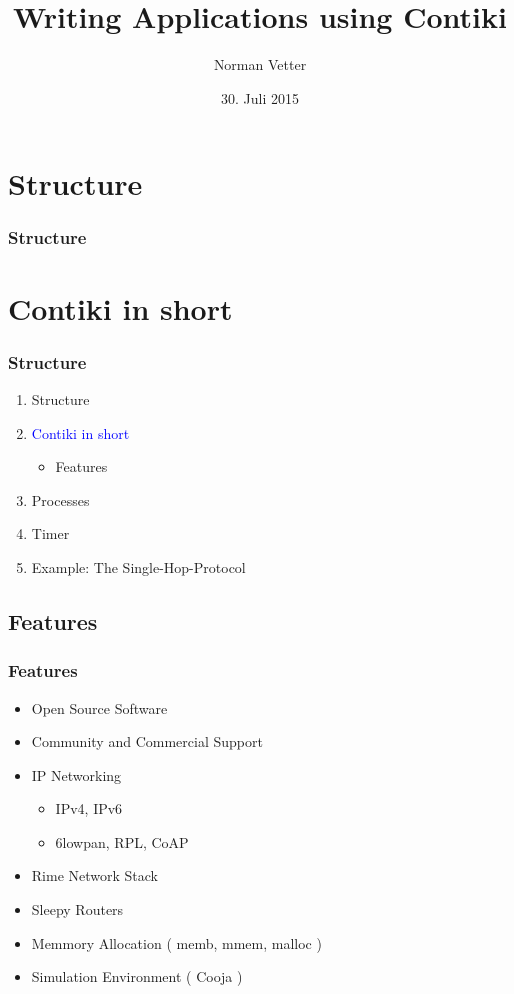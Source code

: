 \documentclass{beamer}
\title{Writing Applications using Contiki}
\author{Norman Vetter}
\date{30. Juli 2015}
\institute[Universität Potsdam]{}
\begin{document}
\begin{frame}
\titlepage
\end{frame}

\section{Structure}
\begin{frame}
\frametitle{Structure}
\tableofcontents
\end{frame}
\section{Contiki in short}
\begin{frame}
\frametitle{Structure}
\begin{enumerate}
\item Structure
\item \textcolor{blue}{Contiki in short}
\begin{itemize}
\item Features
\end{itemize}
\item Processes
\item Timer
\item Example: The Single-Hop-Protocol
\end{enumerate}
\end{frame}

\subsection*{Features}
\begin{frame}
\frametitle{Features}
\begin{itemize}
\item Open Source Software
\item Community and Commercial Support
\item IP Networking
\begin{itemize}
\item IPv4, IPv6
\item 6lowpan, RPL, CoAP
\end{itemize}
\item Rime Network Stack
\item Sleepy Routers
\item Memmory Allocation ( memb, mmem, malloc )
\item Simulation Environment ( Cooja )
\end{itemize}
\end{frame}
\end{document}
